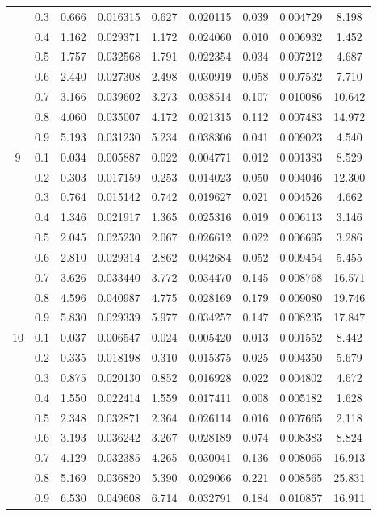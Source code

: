 \begin{longtable}{ | c | c || c | c | c | c | c | c | c | }
 & 0.3 & 0.666 & 0.016315 & 0.627 & 0.020115 & 0.039 & 0.004729 & 8.198 \\
 & 0.4 & 1.162 & 0.029371 & 1.172 & 0.024060 & 0.010 & 0.006932 & 1.452 \\
 & 0.5 & 1.757 & 0.032568 & 1.791 & 0.022354 & 0.034 & 0.007212 & 4.687 \\
 & 0.6 & 2.440 & 0.027308 & 2.498 & 0.030919 & 0.058 & 0.007532 & 7.710 \\
 & 0.7 & 3.166 & 0.039602 & 3.273 & 0.038514 & 0.107 & 0.010086 & 10.642 \\
 & 0.8 & 4.060 & 0.035007 & 4.172 & 0.021315 & 0.112 & 0.007483 & 14.972 \\
 & 0.9 & 5.193 & 0.031230 & 5.234 & 0.038306 & 0.041 & 0.009023 & 4.540 \\
 \hline
\multirow{9}{*}{9} & 0.1 & 0.034 & 0.005887 & 0.022 & 0.004771 & 0.012 & 0.001383 & 8.529 \\
 & 0.2 & 0.303 & 0.017159 & 0.253 & 0.014023 & 0.050 & 0.004046 & 12.300 \\
 & 0.3 & 0.764 & 0.015142 & 0.742 & 0.019627 & 0.021 & 0.004526 & 4.662 \\
 & 0.4 & 1.346 & 0.021917 & 1.365 & 0.025316 & 0.019 & 0.006113 & 3.146 \\
 & 0.5 & 2.045 & 0.025230 & 2.067 & 0.026612 & 0.022 & 0.006695 & 3.286 \\
 & 0.6 & 2.810 & 0.029314 & 2.862 & 0.042684 & 0.052 & 0.009454 & 5.455 \\
 & 0.7 & 3.626 & 0.033440 & 3.772 & 0.034470 & 0.145 & 0.008768 & 16.571 \\
 & 0.8 & 4.596 & 0.040987 & 4.775 & 0.028169 & 0.179 & 0.009080 & 19.746 \\
 & 0.9 & 5.830 & 0.029339 & 5.977 & 0.034257 & 0.147 & 0.008235 & 17.847 \\
 \hline
\multirow{9}{*}{10} & 0.1 & 0.037 & 0.006547 & 0.024 & 0.005420 & 0.013 & 0.001552 & 8.442 \\
 & 0.2 & 0.335 & 0.018198 & 0.310 & 0.015375 & 0.025 & 0.004350 & 5.679 \\
 & 0.3 & 0.875 & 0.020130 & 0.852 & 0.016928 & 0.022 & 0.004802 & 4.672 \\
 & 0.4 & 1.550 & 0.022414 & 1.559 & 0.017411 & 0.008 & 0.005182 & 1.628 \\
 & 0.5 & 2.348 & 0.032871 & 2.364 & 0.026114 & 0.016 & 0.007665 & 2.118 \\
 & 0.6 & 3.193 & 0.036242 & 3.267 & 0.028189 & 0.074 & 0.008383 & 8.824 \\
 & 0.7 & 4.129 & 0.032385 & 4.265 & 0.030041 & 0.136 & 0.008065 & 16.913 \\
 & 0.8 & 5.169 & 0.036820 & 5.390 & 0.029066 & 0.221 & 0.008565 & 25.831 \\
 & 0.9 & 6.530 & 0.049608 & 6.714 & 0.032791 & 0.184 & 0.010857 & 16.911 \\
 \hline
\hline
\end{longtable}
 
